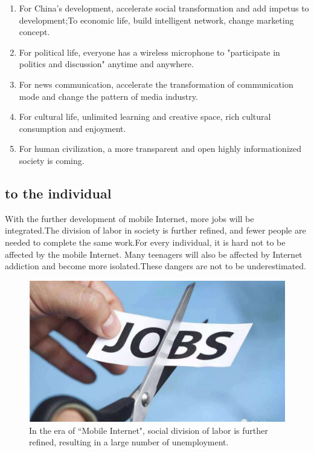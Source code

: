 \documentclass{elsarticle}
\begin{document}
\begin{enumerate}
	\item For China's development, accelerate social transformation and add impetus to development;To economic life, build intelligent network, change marketing concept.
	\item For political life, everyone has a wireless microphone to "participate in politics and discussion" anytime and anywhere.
	\item For news communication, accelerate the transformation of communication mode and change the pattern of media industry.
	\item For cultural life, unlimited learning and creative space, rich cultural consumption and enjoyment.
	\item For human civilization, a more transparent and open highly informationized society is coming.

\end{enumerate}


\subsection{to the individual}
With the further development of mobile Internet, more jobs will be integrated.The division of labor in society is further refined, and fewer people are needed to complete the same work.For every individual, it is hard not to be affected by the mobile Internet. Many teenagers will also be affected by Internet addiction and become more isolated.These dangers are not to be underestimated.

\begin{figure}[ht!]
	\centering
	\includegraphics[trim=0in 3in 0in 0in,clip,width=0.75\columnwidth]{pics/caiyuan.png}
	\caption{In the era of ``Mobile Internet", social division of labor is further refined, resulting in a large number of unemployment.\label{fig:caiyuan}}
\end{figure}
\end{document}

